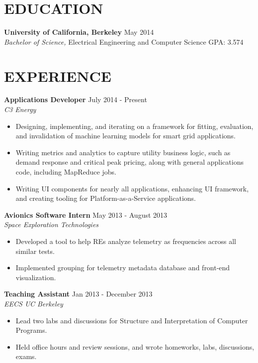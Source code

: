 \documentclass[line,margin]{res}
\begin{document}
\address{673 Brannan Street Unit 315, San Francisco CA 94107}
\address{(973) 647-5056 $|$ richard.hwang201@gmail.com}

\begin{resume}
\section{EDUCATION}
{\bf University of California, Berkeley} \hfill {\small May 2014}\\
{\sl Bachelor of Science,} Electrical Engineering and Computer Science \hfill GPA: 3.574


\section{EXPERIENCE}
{\bf Applications Developer} \hfill {\small July 2014 - Present} \\
{\it C3 Energy}
\begin{itemize} \itemsep -1pt
  \item Designing, implementing, and iterating on a framework for fitting, evaluation,
        and invalidation of machine learning models for smart grid applications.
  \item Writing metrics and analytics to capture utility business logic, such as demand
        response and critical peak pricing, along with general applications code, including
        MapReduce jobs.
  \item Writing UI components for nearly all applications, enhancing UI framework, and
        creating tooling for Platform-as-a-Service applications.
\end{itemize}

{\bf Avionics Software Intern} \hfill {\small May 2013 - August 2013} \\
{\it Space Exploration Technologies}
\begin{itemize} \itemsep -1pt
  \item Developed a tool to help REs analyze telemetry as frequencies across all
        similar tests.
  \item Implemented grouping for telemetry metadata database and front-end visualization.
\end{itemize}

{\bf Teaching Assistant} \hfill {\small Jan 2013 - December 2013} \\
{\it EECS UC Berkeley}
\begin{itemize}  \itemsep -1pt
  \item Lead two labs and discussions for Structure and Interpretation of Computer
        Programs.
  \item Held office hours and review sessions, and wrote homeworks, labs, discussions,
        exams.
\end{itemize}



\end{resume}
\end{document}
